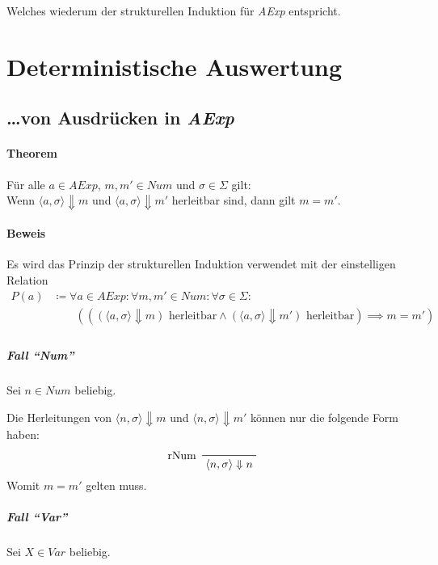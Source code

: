 					    Welches wiederum der strukturellen Induktion für \textit{AExp} entspricht.
    
    \section{Deterministische Auswertung}
		    \subsection{\dots von Ausdrücken in \textit{AExp}}
 		    \paragraph{Theorem}
	 		    Für alle $ a \in \textit{AExp} $, $ m, m' \in \textit{Num} $ und $ \sigma \in \Sigma $ gilt: \\
	 		    Wenn $ \langle a, \sigma \rangle \Downarrow m $ und $ \langle a, \sigma \rangle \Downarrow m' $ herleitbar sind, dann gilt $ m = m' $.
 		    
 		    \paragraph{Beweis}
	 		    Es wird das Prinzip der strukturellen Induktion verwendet mit der einstelligen Relation
	 		    \begin{align*}
		 		    P(a) & \coloneqq \forall a \in \textit{AExp} : \forall m, m' \in \textit{Num} : \forall \sigma \in \Sigma : \\
		 		    & \quad\quad (((\langle a, \sigma \rangle \Downarrow m) \text{ herleitbar} \land (\langle a, \sigma \rangle \Downarrow m') \text{ herleitbar}) \implies m = m') \\
	 		    \end{align*}
	 		    
	 		    \subparagraph{Fall \enquote{Num}}
		 		    Sei $ n \in \textit{Num} $ beliebig.
	 		    
		 		    Die Herleitungen von $ \langle n, \sigma \rangle \Downarrow m $ und $ \langle n, \sigma \rangle \Downarrow m' $ können nur die folgende Form haben:
		 		    \begin{equation*}
			 		    \prftree[l]
				 		    { rNum }
				 		    { \langle n, \sigma \rangle \Downarrow n }
		 		    \end{equation*}
		 		    Womit $ m = m' $ gelten muss.
	 		    
	 		    \subparagraph{Fall \enquote{Var}}
		 		    Sei $ X \in \textit{Var} $ beliebig.
	 		    
